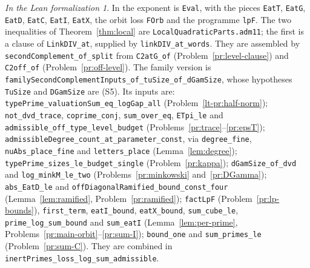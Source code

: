 \documentclass[reqno]{amsart}
\theoremstyle{definition}
\theoremstyle{plain}
\theoremstyle{remark}
\newtheorem*{leanremark}{In the Lean formalization}
\newcommand{\tl}[1]{\texttt{#1}}
\begin{document}
\begin{leanremark}
\raggedright In \cite{Lean} the exponent is \tl{Eval}, with the pieces \tl{EatT}, \tl{EatG}, \tl{EatD}, \tl{EatC}, \tl{EatI}, \tl{EatX}, the orbit loss \tl{FOrb} and the programme \tl{lpF}.  The two inequalities of Theorem~\ref{thm:local} are \tl{LocalQuadraticParts.adm11}; the first is a clause of \tl{LinkDIV\_\allowbreak{}at}, supplied by \tl{linkDIV\_\allowbreak{}at\_\allowbreak{}words}.  They are assembled by \tl{secondComplement\_\allowbreak{}of\_\allowbreak{}split} from \tl{C2atG\_\allowbreak{}of} (Problem~\ref{pr:level-clause}) and \tl{C2off\_\allowbreak{}of} (Problem~\ref{pr:off-level}).  The family version is \tl{familySecondComplementInputs\_\allowbreak{}of\_\allowbreak{}tuSize\_\allowbreak{}of\_\allowbreak{}dGamSize}, whose hypotheses \tl{TuSize} and \tl{DGamSize} are (S5).  Its inputs are:
\tl{typePrime\_\allowbreak{}valuationSum\_\allowbreak{}eq\_\allowbreak{}logGap\_\allowbreak{}all} (Problem~\ref{lt-pr:half-norm});
\tl{not\_\allowbreak{}dvd\_\allowbreak{}trace}, \tl{coprime\_\allowbreak{}conj}, \tl{sum\_\allowbreak{}over\_\allowbreak{}eq}, \tl{ETpi\_\allowbreak{}le} and \tl{admissible\_\allowbreak{}off\_\allowbreak{}type\_\allowbreak{}level\_\allowbreak{}budget} (Problems~\ref{pr:trace}--\ref{pr:epsT});
\tl{admissibleDegree\_\allowbreak{}count\_\allowbreak{}at\_\allowbreak{}parameter\_\allowbreak{}const}, via \tl{degree\_\allowbreak{}fine}, \tl{nuAbs\_\allowbreak{}place\_\allowbreak{}fine} and \tl{letters\_\allowbreak{}place} (Lemma~\ref{lem:degree});
\tl{typePrime\_\allowbreak{}sizes\_\allowbreak{}le\_\allowbreak{}budget\_\allowbreak{}single} (Problem~\ref{pr:kappa});
\tl{dGamSize\_\allowbreak{}of\_\allowbreak{}dvd} and \tl{log\_\allowbreak{}minkM\_\allowbreak{}le\_\allowbreak{}two} (Problems~\ref{pr:minkowski} and~\ref{pr:DGamma});
\tl{abs\_\allowbreak{}EatD\_\allowbreak{}le} and \tl{offDiagonalRamified\_\allowbreak{}bound\_\allowbreak{}const\_\allowbreak{}four} (Lemma~\ref{lem:ramified}, Problem~\ref{pr:ramified});
\tl{factLpF} (Problem~\ref{pr:lp-bounds}), \tl{first\_\allowbreak{}term}, \tl{eatI\_\allowbreak{}bound}, \tl{eatX\_\allowbreak{}bound}, \tl{sum\_\allowbreak{}cube\_\allowbreak{}le}, \tl{prime\_\allowbreak{}log\_\allowbreak{}sum\_\allowbreak{}bound} and \tl{sum\_\allowbreak{}eatI} (Lemma~\ref{lem:per-prime}, Problems~\ref{pr:main-orbit}--\ref{pr:sum-I});
\tl{bound\_\allowbreak{}one} and \tl{sum\_\allowbreak{}primes\_\allowbreak{}le} (Problem~\ref{pr:sum-C}).
They are combined in \tl{inertPrimes\_\allowbreak{}loss\_\allowbreak{}log\_\allowbreak{}sum\_\allowbreak{}admissible}.
\end{leanremark}
\end{document}
